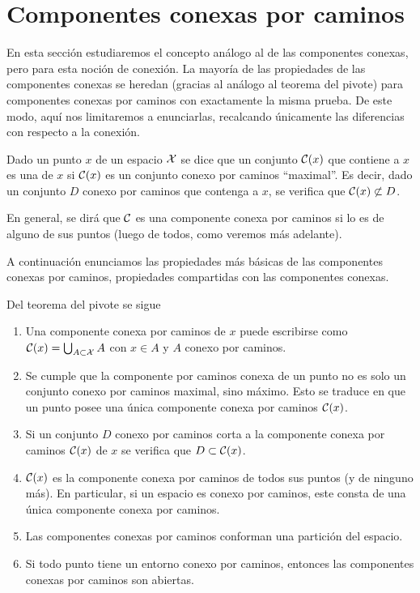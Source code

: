 \section{Componentes conexas por caminos}
En esta sección estudiaremos el concepto análogo al de las componentes conexas, pero para esta noción de conexión. La mayoría de las propiedades de las componentes conexas se heredan (gracias al análogo al teorema del pivote) para componentes conexas por caminos con exactamente la misma prueba. De este modo, aquí nos limitaremos a enunciarlas, recalcando únicamente las diferencias con respecto a la conexión.
\begin{defi}
	Dado un punto $x$ de un espacio $\mathcal{X}$ se dice que un conjunto $\mathcal{C}(x)$ que contiene a $x$ es una  de $x$ si $\mathcal{C}(x)$ es un conjunto conexo por caminos ``maximal''. Es decir, dado un conjunto $D$ conexo por caminos que contenga a $x$, se verifica que $\mathcal{C}(x)\not\subset D$.
	
	En general, se dirá que $\mathcal{C}$ es una componente conexa por caminos si lo es de alguno de sus puntos (luego de todos, como veremos más adelante).
\end{defi}
A continuación enunciamos las propiedades más básicas de las componentes conexas por caminos, propiedades compartidas con las componentes conexas.
\begin{obs}Del teorema del pivote se sigue
	\begin{enumerate}
		\item Una componente conexa por caminos de $x$ puede escribirse como $\mathcal{C}(x)=\bigcup_{A\subset\mathcal{X}}A$ con $x\in A$ y $A$ conexo por caminos.
		\item Se cumple que la componente por caminos conexa de un punto no es solo un conjunto conexo por caminos maximal, sino máximo. Esto se traduce en que un punto posee una única componente conexa por caminos $\mathcal{C}(x)$.
		\item Si un conjunto $D$ conexo por caminos corta a la componente conexa por caminos $\mathcal{C}(x)$ de $x$ se verifica que $D\subset \mathcal{C}(x)$.
		\item $\mathcal{C}(x)$ es la componente conexa por caminos de todos sus puntos (y de ninguno más). En particular, si un espacio es conexo por caminos, este consta de una única componente conexa por caminos.
		\item Las componentes conexas por caminos conforman una partición del espacio.
		\item Si todo punto tiene un entorno conexo por caminos, entonces las componentes conexas por caminos son abiertas.\qedhere
	\end{enumerate}
\end{obs}
